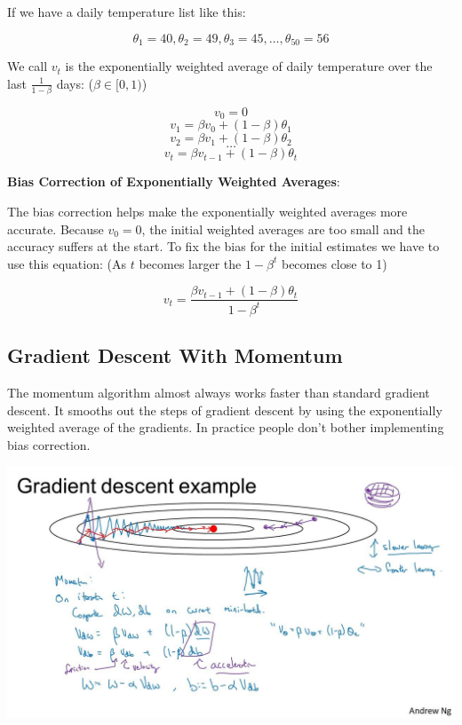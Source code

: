\documentclass{article}
\begin{document}
\noindent If we have a daily temperature list like this:

\[\theta_{1} = 40, \theta_{2} = 49, \theta_{3} = 45, \dots, \theta_{50} = 56\]

\noindent We call \(v_{t}\) is the exponentially weighted average of daily temperature over the last \(\frac{1}{1 - \beta}\) days: (\(\beta \in [0, 1)\))

\[v_{0} = 0\]
\[v_{1} = \beta v_{0} + (1 - \beta) \theta_{1}\]
\[v_{2} = \beta v_{1} + (1 - \beta) \theta_{2}\]
\[\dots\]
\[v_{t} = \beta v_{t - 1} + (1 - \beta) \theta_{t}\]

\noindent \textbf{Bias Correction of Exponentially Weighted Averages}:

\noindent The bias correction helps make the exponentially weighted averages more accurate. Because \(v_{0} = 0\), the initial weighted averages are too small and the accuracy suffers at the start. To fix the bias for the initial estimates we have to use this equation: (As \(t\) becomes larger the \(1 - \beta^{t}\) becomes close to 1)

\[v_{t} = \frac{\beta v_{t - 1} + (1 - \beta) \theta_{t}}{1 - \beta^{t}}\]

\subsection{Gradient Descent With Momentum}

\noindent The momentum algorithm almost always works faster than standard gradient descent. It smooths out the steps of gradient descent by using the exponentially weighted average of the gradients. In practice people don't bother implementing bias correction.

\begin{center}
\includegraphics[scale=0.2]{./images/momentum_gradient_descent.jpg}
\end{center}
\end{document}
